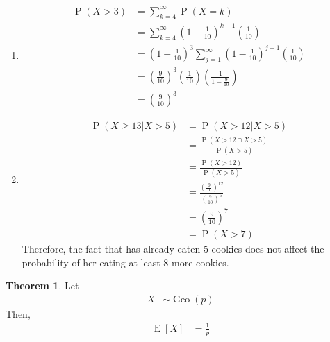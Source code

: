 \documentclass[titlepage, fleqn, a4paper, 12pt, twoside]{article}
\theoremstyle{definition}
\theoremstyle{theorem}
\newtheorem{theorem}{Theorem}
\DeclareMathOperator{\prob}{\mathrm{P}}
\DeclareMathOperator{\expct}{\mathrm{E}}
\DeclareMathOperator{\geo}{\mathrm{Geo}}
\newcommand{\A}{\text{Alice}\xspace}
\begin{document}
\begin{solution}
	\begin{enumerate}[leftmargin=*]
		\item
			\begin{align*}
				\prob(X > 3) & = \sum\limits_{k = 4}^{\infty} \prob(X = k)                                                                                          \\
                                             & = \sum\limits_{k = 4}^{\infty} \left( 1 - \frac{1}{10} \right)^{k - 1} \left( \frac{1}{10} \right)                                   \\
                                             & = \left( 1 - \frac{1}{10} \right)^3 \sum\limits_{j = 1}^{\infty} \left( 1 - \frac{1}{10} \right)^{j - 1} \left( \frac{1}{10} \right) \\
                                             & = \left( \frac{9}{10} \right)^3 \left( \frac{1}{10} \right) \left( \frac{1}{1 - \frac{9}{10}} \right)                                \\
                                             & = \left( \frac{9}{10} \right)^3
			\end{align*}
		\item
			\begin{align*}
				\prob(X \ge 13 | X > 5) & = \prob(X > 12 | X > 5)                                                  \\
                                                        & = \frac{\prob(X > 12 \cap X > 5)}{\prob(X > 5)}                          \\
                                                        & = \frac{\prob(X > 12)}{\prob(X > 5)}                                     \\
                                                        & = \frac{\left( \frac{9}{10} \right)^{12}}{\left( \frac{9}{10} \right)^5} \\
                                                        & = \left( \frac{9}{10} \right)^7                                          \\
                                                        & = \prob(X > 7)
			\end{align*}
			Therefore, the fact that \A has already eaten $5$ cookies does not affect the probability of her eating at least $8$ more cookies.
	\end{enumerate}
\end{solution}

\begin{theorem}
	Let
	\begin{align*}
		X & \sim \geo(p)
	\end{align*}
	Then,
	\begin{align*}
		\expct[X] & = \frac{1}{p}
	\end{align*}
\end{theorem}
\end{document}
